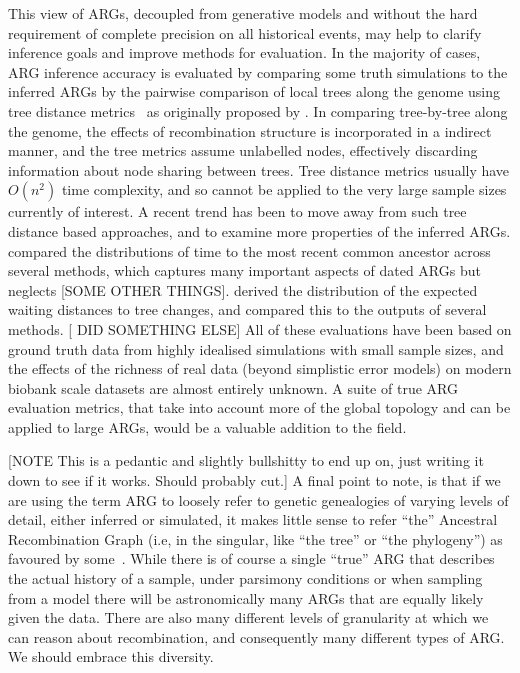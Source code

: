 \documentclass{article}
\begin{document}
This view of ARGs,
decoupled from generative models and
without the hard requirement
of complete precision on all historical events, may help
to clarify inference goals and improve
methods for evaluation.
In the majority of cases,
ARG inference accuracy is evaluated by comparing some truth simulations
to the inferred ARGs by the pairwise comparison of local trees along the genome
using tree distance
metrics~\citep[e.g.][]{robinson1981comparison,kendall2016mapping}
as originally proposed by \citet{kuhner2015assessing}.
In comparing tree-by-tree along the genome, the effects of recombination
structure is incorporated in a indirect manner, and the tree
metrics assume unlabelled nodes, effectively discarding information
about node sharing between trees.
Tree distance metrics usually have $O(n^2)$ time complexity, and so cannot be
applied to the very large sample sizes currently of interest.
A recent trend has been to move away from such tree distance
based approaches, and to examine more properties of the inferred ARGs.
\citet{brandt2021evaluation} compared the
distributions of time to the most recent common ancestor across several
methods, which captures many important aspects of dated ARGs
but neglects [SOME OTHER THINGS].
\citet{deng2021distribution} derived the distribution of the expected
waiting distances to tree changes, and compared this to the
outputs of several methods.
[ \citet{ignatieva2023distribution} DID SOMETHING ELSE]
All of these evaluations have been based on
ground truth data from highly idealised simulations
with small sample sizes,
and the effects of the richness of real data
(beyond simplistic error models)
on modern biobank scale datasets
are almost entirely unknown.
A suite of true ARG evaluation metrics, that take into account more of the
global topology and can be applied to large ARGs, would be a
valuable addition to the field.

[NOTE This is a pedantic and slightly bullshitty to end up on,
just writing it down to see if it works. Should probably cut.]
A final point to note, is that
if we are using the term ARG
to loosely refer to genetic genealogies of varying
levels of detail, either inferred or simulated,
it makes little sense to refer ``the'' Ancestral Recombination
Graph (i.e, in  the singular, like ``the tree'' or
``the phylogeny'')
as favoured by some~\citep[e.g.][]{
arenas2013importance,palamara2016argon,hubisz2020inference}.
While there is of course a single ``true'' ARG that describes
the actual history of a sample, 
under parsimony conditions or when sampling from a model there 
will be astronomically
many ARGs that are equally likely given the data.
There are also many different levels of granularity at which we
can reason about recombination, 
and consequently many different types of ARG.
We should embrace this diversity.
\end{document}
